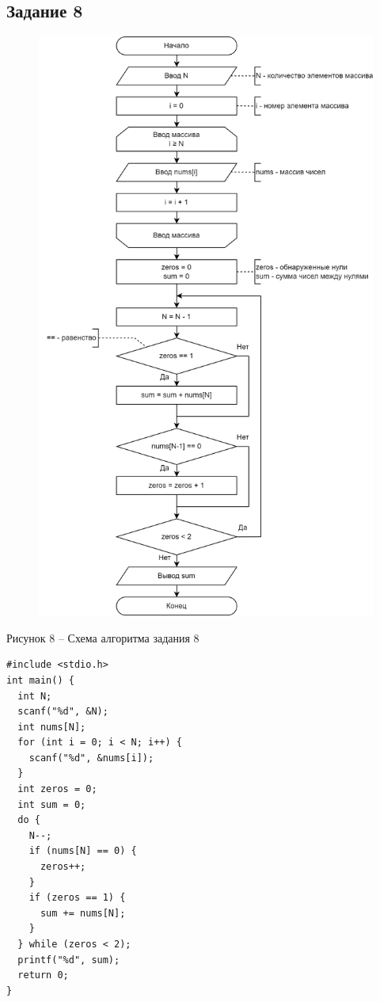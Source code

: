 \documentclass[a4paper,14pt]{extarticle}
\begin{document}
  \subsection*{Задание 8}
  \begin{figure}[h]
    \centering
    \includegraphics[width=0.68\linewidth]{schemes/s-8}
  \end{figure}
  \begin{center}
    Рисунок 8 – Схема алгоритма задания 8
  \end{center}

  \pagebreak
  \begin{lstlisting}[tabsize=2,basicstyle=\ttfamily]
#include <stdio.h>
int main() {
  int N;
  scanf("%d", &N);
  int nums[N];
  for (int i = 0; i < N; i++) {
    scanf("%d", &nums[i]);
  }
  int zeros = 0;
  int sum = 0;
  do {
    N--;
    if (nums[N] == 0) {
      zeros++;
    }
    if (zeros == 1) {
      sum += nums[N];
    }
  } while (zeros < 2);
  printf("%d", sum);
  return 0;
}
  \end{lstlisting}

  \newpage
\end{document}
